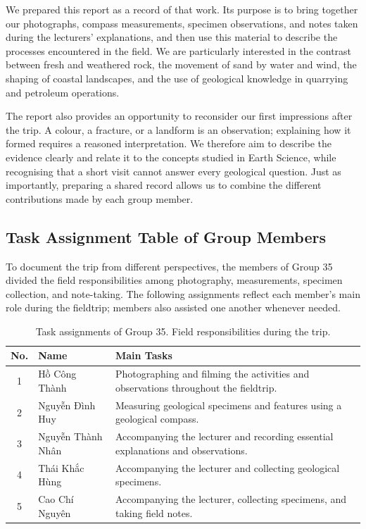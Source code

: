 \documentclass[11pt, a4paper]{article}
\begin{document}
We prepared this report as a record of that work. Its purpose is to bring together our photographs, compass measurements, specimen observations, and notes taken during the lecturers' explanations, and then use this material to describe the processes encountered in the field. We are particularly interested in the contrast between fresh and weathered rock, the movement of sand by water and wind, the shaping of coastal landscapes, and the use of geological knowledge in quarrying and petroleum operations.

The report also provides an opportunity to reconsider our first impressions after the trip. A colour, a fracture, or a landform is an observation; explaining how it formed requires a reasoned interpretation. We therefore aim to describe the evidence clearly and relate it to the concepts studied in Earth Science, while recognising that a short visit cannot answer every geological question. Just as importantly, preparing a shared record allows us to combine the different contributions made by each group member.

\subsection{Task Assignment Table of Group Members}
To document the trip from different perspectives, the members of Group 35 divided the field responsibilities among photography, measurements, specimen collection, and note-taking. The following assignments reflect each member's main role during the fieldtrip; members also assisted one another whenever needed.

\begin{table}[htbp]
    \centering
    \caption[Task assignments of Group 35]{Task assignments of Group 35. Field responsibilities during the trip.}
    \label{tab:group_assignments}
    \small
    \renewcommand{\arraystretch}{1.3}
    \begin{tabular}{@{}c p{3.6cm} p{8.7cm}@{}}
        \toprule
        \textbf{No.} & \textbf{Name} & \textbf{Main Tasks} \\
        \midrule
        1 & Hồ Công Thành & Photographing and filming the activities and observations throughout the fieldtrip. \\
        2 & Nguyễn Đình Huy & Measuring geological specimens and features using a geological compass. \\
        3 & Nguyễn Thành Nhân & Accompanying the lecturer and recording essential explanations and observations. \\
        4 & Thái Khắc Hùng & Accompanying the lecturer and collecting geological specimens. \\
        5 & Cao Chí Nguyên & Accompanying the lecturer, collecting specimens, and taking field notes. \\
        \bottomrule
    \end{tabular}
\end{table}
\end{document}
